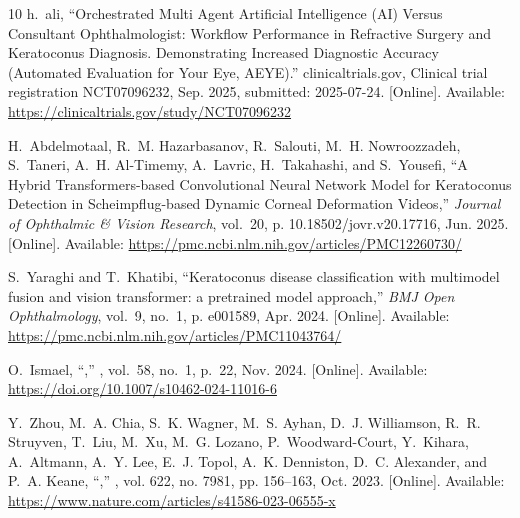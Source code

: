 \begin{thebibliography}{10}
\BIBentryALTinterwordspacing
h.~ali, ``Orchestrated {Multi} {Agent} {Artificial} {Intelligence} ({AI})
  {Versus} {Consultant} {Ophthalmologist}: {Workflow} {Performance} in
  {Refractive} {Surgery} and {Keratoconus} {Diagnosis}. {Demonstrating}
  {Increased} {Diagnostic} {Accuracy} ({Automated} {Evaluation} for {Your}
  {Eye}, {AEYE}).'' clinicaltrials.gov, Clinical trial registration
  NCT07096232, Sep. 2025, submitted: 2025-07-24. [Online]. Available:
  \url{https://clinicaltrials.gov/study/NCT07096232}
\BIBentrySTDinterwordspacing

\BIBentryALTinterwordspacing
H.~Abdelmotaal, R.~M. Hazarbasanov, R.~Salouti, M.~H. Nowroozzadeh, S.~Taneri,
  A.~H. Al-Timemy, A.~Lavric, H.~Takahashi, and S.~Yousefi, ``A {Hybrid}
  {Transformers}-based {Convolutional} {Neural} {Network} {Model} for
  {Keratoconus} {Detection} in {Scheimpflug}-based {Dynamic} {Corneal}
  {Deformation} {Videos},'' \emph{Journal of Ophthalmic \& Vision Research},
  vol.~20, p. 10.18502/jovr.v20.17716, Jun. 2025. [Online]. Available:
  \url{https://pmc.ncbi.nlm.nih.gov/articles/PMC12260730/}
\BIBentrySTDinterwordspacing

\BIBentryALTinterwordspacing
S.~Yaraghi and T.~Khatibi, ``Keratoconus disease classification with multimodel
  fusion and vision transformer: a pretrained model approach,'' \emph{BMJ Open
  Ophthalmology}, vol.~9, no.~1, p. e001589, Apr. 2024. [Online]. Available:
  \url{https://pmc.ncbi.nlm.nih.gov/articles/PMC11043764/}
\BIBentrySTDinterwordspacing

\BIBentryALTinterwordspacing
O.~Ismael, ``,''
  \emph{}, vol.~58,
  no.~1, p.~22, Nov. 2024. [Online]. Available:
  \url{https://doi.org/10.1007/s10462-024-11016-6}
\BIBentrySTDinterwordspacing

\BIBentryALTinterwordspacing
Y.~Zhou, M.~A. Chia, S.~K. Wagner, M.~S. Ayhan, D.~J. Williamson, R.~R.
  Struyven, T.~Liu, M.~Xu, M.~G. Lozano, P.~Woodward-Court, Y.~Kihara,
  A.~Altmann, A.~Y. Lee, E.~J. Topol, A.~K. Denniston, D.~C. Alexander, and
  P.~A. Keane, ``,''
  \emph{}, vol. 622, no. 7981, pp. 156--163,
  Oct. 2023. [Online]. Available:
  \url{https://www.nature.com/articles/s41586-023-06555-x}
\BIBentrySTDinterwordspacing


\end{thebibliography}
